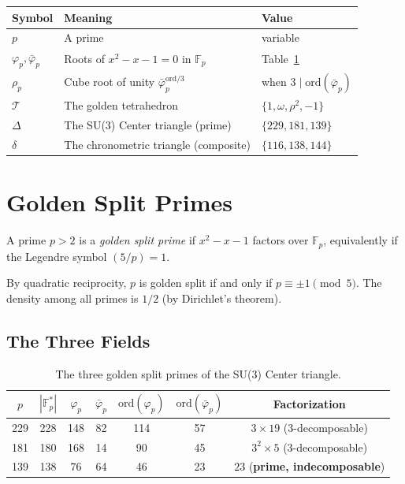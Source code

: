 \begin{center}
\begin{tabular}{@{}lll@{}}
\toprule
Symbol & Meaning & Value \\
\midrule
$p$ & A prime & variable \\
$\varphi_p, \bar\varphi_p$ & Roots of $x^2 - x - 1 = 0$ in $\mathbb{F}_p$ & Table~\ref{tab:fields} \\
$\rho_p$ & Cube root of unity $\bar\varphi_p^{\mathrm{ord}/3}$ & when $3 \mid \mathrm{ord}(\bar\varphi_p)$ \\
$\mathcal{T}$ & The golden tetrahedron & $\{1, \omega, \rho^2, -1\}$ \\
$\Delta$ & The SU(3) Center triangle (prime) & $\{229, 181, 139\}$ \\
$\delta$ & The chronometric triangle (composite) & $\{116, 138, 144\}$ \\
\bottomrule
\end{tabular}
\end{center}

\section{Golden Split Primes}
\label{sec:golden}

\begin{definition}
\label{def:golden}
A prime $p > 2$ is a \emph{golden split prime} if $x^2 - x - 1$
factors over $\mathbb{F}_p$, equivalently if the Legendre symbol
$(5/p) = 1$.
\end{definition}

By quadratic reciprocity, $p$ is golden split if and only if
$p \equiv \pm 1 \pmod{5}$. The density among all primes is $1/2$
(by Dirichlet's theorem).

\subsection{The Three Fields}

\begin{table}[h]
\centering
\caption{The three golden split primes of the SU(3) Center triangle.}
\label{tab:fields}
\begin{tabular}{@{}ccccccc@{}}
\toprule
$p$ & $|{\mathbb{F}_p^*}|$ & $\varphi_p$ & $\bar\varphi_p$
    & $\mathrm{ord}(\varphi_p)$ & $\mathrm{ord}(\bar\varphi_p)$
    & Factorization \\
\midrule
229 & 228 & 148 & 82  & 114 & 57  & $3 \times 19$ (3-decomposable) \\
181 & 180 & 168 & 14  &  90 & 45  & $3^2 \times 5$ (3-decomposable) \\
139 & 138 &  76 & 64  &  46 & 23  & $23$ (\textbf{prime, indecomposable}) \\
\bottomrule
\end{tabular}
\end{table}

